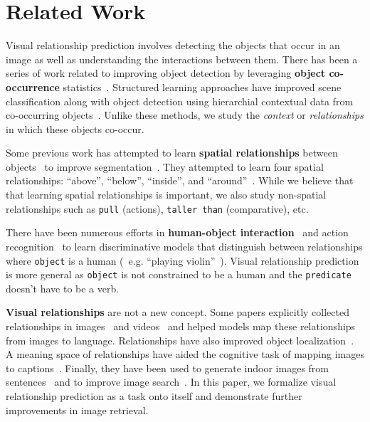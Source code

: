 \documentclass[runningheads]{llncs}
\newcommand{\eg}[1]{e.g. #1}
\begin{document}
\section{Related Work}
Visual relationship prediction involves detecting the objects that occur in an image as well as understanding the interactions between them. There has been a series of work related to improving object detection by leveraging \textbf{object co-occurrence} statistics~\cite{mensink2014costa,salakhutdinov2011learning,ladicky2010graph,rabinovich2007objects,galleguillos2008object,galleguillos2010context}. Structured learning approaches have improved scene classification along with object detection using hierarchial contextual data from co-occurring objects~\cite{choi2010exploiting,izadinia2014incorporating,fidler2007towards,sivic2005discovering}. Unlike these methods, we study the \textit{context} or \textit{relationships} in which these objects co-occur.

Some previous work has attempted to learn \textbf{spatial relationships} between objects~\cite{gould2008multi,galleguillos2008object} to improve segmentation~\cite{gould2008multi}. They attempted to learn four spatial relationships: ``above'', ``below'', ``inside'', and ``around''~\cite{galleguillos2008object}. While we believe that that learning spatial relationships is important, we also study non-spatial relationships such as \texttt{pull} (actions), \texttt{taller than} (comparative), etc.

There have been numerous efforts in \textbf{human-object interaction}~\cite{rohrbach2013translating,yao2010modeling,maji2011action} and action recognition~\cite{gupta2009observing} to learn discriminative models that distinguish between relationships where \texttt{object} is a human (~\eg ``playing violin''~\cite{yao2010grouplet}). Visual relationship prediction is more general as \texttt{object} is not constrained to be a human and the \texttt{predicate} doesn't have to be a verb.

\textbf{Visual relationships} are not a new concept. Some papers explicitly collected relationships in images~\cite{ramanathan2015learning,guadarrama2013youtube2text,regneri2013grounding,thomason2014integrating,yao2012describing} and videos~\cite{regneri2013grounding,kulkarni2011baby,zitnick2013learning} and helped models map these relationships from images to language. Relationships have also improved object localization~\cite{gupta2008beyond,kumar2010efficiently,sadeghi2011recognition,russell2006using}. A meaning space of relationships have aided the cognitive task of mapping images to captions~\cite{farhadi2010every,berg2012understanding,hoiem2008putting,fang2014captions}. Finally, they have been used to generate indoor images from sentences~\cite{chang2014semantic} and to improve image search~\cite{Johnson2015Image,schustergenerating}. In this paper, we formalize visual relationship prediction as a task onto itself and demonstrate further improvements in image retrieval.
\end{document}
